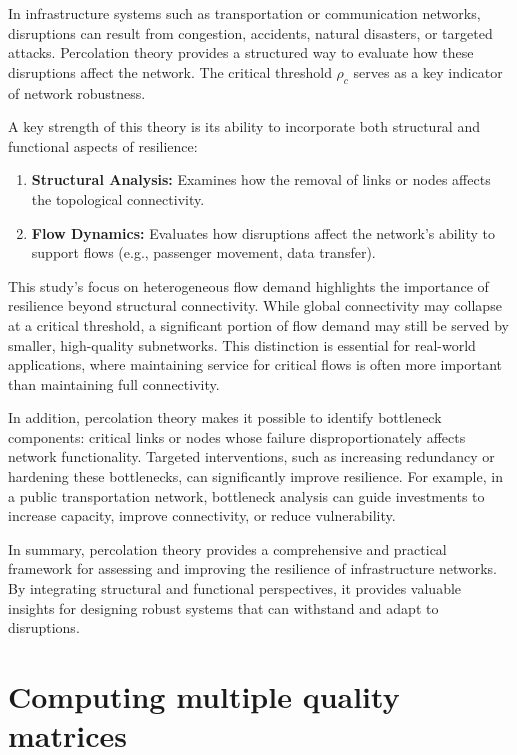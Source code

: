 \documentclass[
  letterpaper,
  DIV=11,
  numbers=noendperiod]{scrartcl}
\providecommand{\tightlist}{%
  \setlength{\itemsep}{0pt}\setlength{\parskip}{0pt}}\usepackage{longtable,booktabs,array}
\begin{document}
In infrastructure systems such as transportation or communication
networks, disruptions can result from congestion, accidents, natural
disasters, or targeted attacks. Percolation theory provides a structured
way to evaluate how these disruptions affect the network. The critical
threshold \(\rho_c\) serves as a key indicator of network robustness.

A key strength of this theory is its ability to incorporate both
structural and functional aspects of resilience:

\begin{enumerate}
\def\labelenumi{\arabic{enumi}.}
\tightlist
\item
  \textbf{Structural Analysis:} Examines how the removal of links or
  nodes affects the topological connectivity.
\item
  \textbf{Flow Dynamics:} Evaluates how disruptions affect the network's
  ability to support flows (e.g., passenger movement, data transfer).
\end{enumerate}

This study's focus on heterogeneous flow demand highlights the
importance of resilience beyond structural connectivity. While global
connectivity may collapse at a critical threshold, a significant portion
of flow demand may still be served by smaller, high-quality subnetworks.
This distinction is essential for real-world applications, where
maintaining service for critical flows is often more important than
maintaining full connectivity.

In addition, percolation theory makes it possible to identify bottleneck
components: critical links or nodes whose failure disproportionately
affects network functionality. Targeted interventions, such as
increasing redundancy or hardening these bottlenecks, can significantly
improve resilience. For example, in a public transportation network,
bottleneck analysis can guide investments to increase capacity, improve
connectivity, or reduce vulnerability.

In summary, percolation theory provides a comprehensive and practical
framework for assessing and improving the resilience of infrastructure
networks. By integrating structural and functional perspectives, it
provides valuable insights for designing robust systems that can
withstand and adapt to disruptions.

\section{Computing multiple quality
matrices}\label{computing-multiple-quality-matrices}
\end{document}

